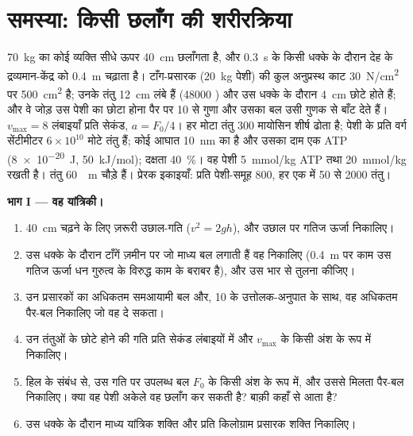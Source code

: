 \section{समस्या: किसी छलाँग की शरीरक्रिया}

\begin{problem}
\label{pb:b2:muscle-movement:1}
\qty{70}{kg} का कोई व्यक्ति सीधे ऊपर \qty{40}{cm} छलाँगता है, और
\qty{0.3}{s} के किसी धक्के के दौरान देह के द्रव्यमान-केंद्र को \qty{0.4}{m} चढ़ाता है।
टाँग-प्रसारक (\qty{20}{kg} पेशी) की कुल
अनुप्रस्थ काट \qty{30}{N/cm^2} पर \qty{500}{cm^2} है; उनके तंतु
\qty{12}{cm} लंबे हैं (\num{48000} ) और उस धक्के के दौरान
\qty{4}{cm} छोटे होते हैं; और वे जोड़ उस पेशी का छोटा होना
पैर पर \num{10} से गुणा और उसका बल उसी गुणक से बाँट देते हैं। $v_{\max} = 8$ लंबाइयाँ प्रति सेकंड, $a = F_0/4$। हर
मोटा तंतु \num{300} मायोसिन शीर्ष ढोता है; पेशी के प्रति वर्ग सेंटीमीटर $6\times
10^{10}$ मोटे तंतु हैं; कोई आघात
\qty{10}{nm} का है और उसका दाम एक ATP (\qty{8e-20}{J}, \qty{50}{kJ/mol});
दक्षता \qty{40}{\%}। वह पेशी \qty{5}{mmol/kg} ATP तथा
\qty{20}{mmol/kg}  रखती है। तंतु \qty{60}{\micro
m} चौड़े हैं। प्रेरक इकाइयाँ: प्रति पेशी-समूह \num{800}, हर एक में \num{50} से
\num{2000} तंतु।

\medskip
\noindent\textbf{भाग I --- वह यांत्रिकी।}
\begin{enumerate}
  \item \qty{40}{cm} चढ़ने के लिए ज़रूरी उछाल-गति
        ($v^{2} = 2gh$), और उछाल पर गतिज ऊर्जा निकालिए।
  \item उस धक्के के दौरान टाँगें ज़मीन पर जो माध्य बल लगाती हैं वह
        निकालिए (\qty{0.4}{m} पर काम उस गतिज ऊर्जा
        धन गुरुत्व के विरुद्ध काम के बराबर है), और उस भार से तुलना कीजिए।
  \item उन प्रसारकों का अधिकतम समआयामी बल और, 10 के उत्तोलक-अनुपात के
        साथ, वह अधिकतम पैर-बल निकालिए जो वह
        दे सकता।
  \item उन तंतुओं के छोटे होने की गति प्रति सेकंड लंबाइयों में
        और $v_{\max}$ के किसी अंश के रूप में निकालिए।
  \item हिल के संबंध से, उस गति पर उपलब्ध बल $F_0$ के किसी अंश के रूप में,
        और उससे मिलता पैर-बल निकालिए।
        क्या वह पेशी अकेले वह छलाँग कर सकती है? बाक़ी कहाँ से
        आता है?
  \item उस धक्के के दौरान माध्य यांत्रिक शक्ति और प्रति किलोग्राम
        प्रसारक शक्ति निकालिए।
\end{enumerate}


\end{problem}
